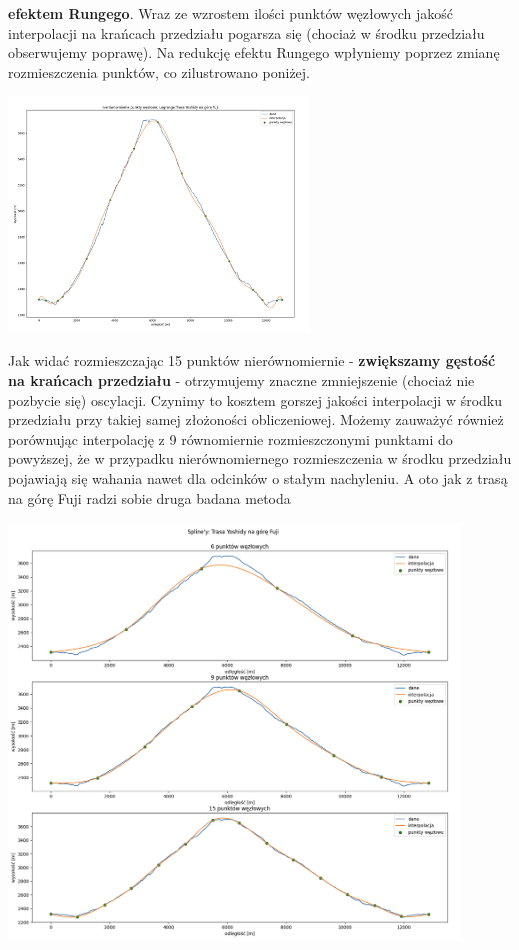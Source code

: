\documentclass{article}
\begin{document}
\textbf{efektem Rungego}. Wraz ze wzrostem ilości punktów węzłowych jakość interpolacji na krańcach przedziału pogarsza się (chociaż w środku przedziału obserwujemy 
poprawę). Na redukcję efektu Rungego wpłyniemy poprzez zmianę rozmieszczenia punktów, co zilustrowano poniżej.
 \begin{center}
	\includegraphics[width=8cm]{lagrange_fuji_runge}
\end{center}
Jak widać rozmieszczając 15 punktów nierównomiernie - \textbf{zwiększamy gęstość na krańcach przedziału} - otrzymujemy znaczne zmniejszenie (chociaż
nie pozbycie się) oscylacji.  Czynimy to kosztem gorszej jakości interpolacji w środku przedziału przy takiej samej złożoności obliczeniowej. Możemy zauważyć
również porównując interpolację z 9 równomiernie rozmieszczonymi punktami do powyższej, że w przypadku nierównomiernego rozmieszczenia w środku przedziału
pojawiają się wahania nawet dla odcinków o stałym nachyleniu. A oto jak z trasą na górę Fuji radzi sobie druga badana metoda
 \begin{center}
	\includegraphics[width=12cm]{spline_fuji_uniform}
\end{center}
\end{document}
